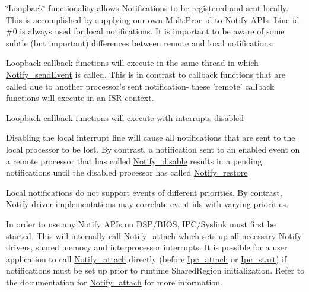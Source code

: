 \char`\"{}Loopback\char`\"{} functionality allows Notifications to be registered and sent locally. This is accomplished by supplying our own MultiProc id to Notify APIs. Line id \#0 is always used for local notifications. It is important to be aware of some subtle (but important) differences between remote and local notifications:


\begin{DoxyItemize}
\item Loopback callback functions will execute in the same thread in which \hyperlink{_notify_8h_ac0f8b4cb2245dd897b5b75485f6b5c13}{Notify\_\-sendEvent} is called. This is in contrast to callback functions that are called due to another processor's sent notification-\/ these 'remote' callback functions will execute in an ISR context.
\end{DoxyItemize}


\begin{DoxyItemize}
\item Loopback callback functions will execute with interrupts disabled
\end{DoxyItemize}


\begin{DoxyItemize}
\item Disabling the local interrupt line will cause all notifications that are sent to the local processor to be lost. By contrast, a notification sent to an enabled event on a remote processor that has called \hyperlink{_notify_8h_a0eeb5a2e898a287ec0e31be4e6a92364}{Notify\_\-disable} results in a pending notifications until the disabled processor has called \hyperlink{_notify_8h_a07248810e2b457664a2a1f24a4179621}{Notify\_\-restore}
\end{DoxyItemize}


\begin{DoxyItemize}
\item Local notifications do not support events of different priorities. By contrast, Notify driver implementations may correlate event ids with varying priorities.
\end{DoxyItemize}

In order to use any Notify APIs on DSP/BIOS, IPC/Syslink must first be started. This will internally call \hyperlink{_notify_8h_a2d6e7fc00357b58ddc2a860e6bd4bf80}{Notify\_\-attach} which sets up all necessary Notify drivers, shared memory and interprocessor interrupts. It is possible for a user application to call \hyperlink{_notify_8h_a2d6e7fc00357b58ddc2a860e6bd4bf80}{Notify\_\-attach} directly (before \hyperlink{_ipc_8h_a170f84915df79377080be708302bcb08}{Ipc\_\-attach} or \hyperlink{_ipc_8h_aca550c6a5498637cfec7b0f4e6d07828}{Ipc\_\-start}) if notifications must be set up prior to runtime SharedRegion initialization. Refer to the documentation for \hyperlink{_notify_8h_a2d6e7fc00357b58ddc2a860e6bd4bf80}{Notify\_\-attach} for more information.

